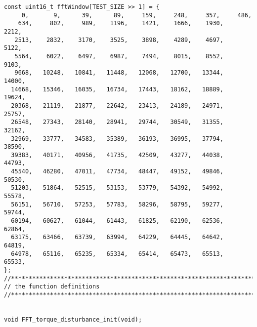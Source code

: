 \begin{lstlisting}[caption=\raggedright{mcu-libs/RLS.h}, frame=single]
const uint16_t fftWindow[TEST_SIZE >> 1] = {
     0,       9,      39,      89,     159,     248,     357,     486,
    634,     802,     989,    1196,    1421,    1666,    1930,    2212,
   2513,    2832,    3170,    3525,    3898,    4289,    4697,    5122,
   5564,    6022,    6497,    6987,    7494,    8015,    8552,    9103,
   9668,   10248,   10841,   11448,   12068,   12700,   13344,   14000,
  14668,   15346,   16035,   16734,   17443,   18162,   18889,   19624,
  20368,   21119,   21877,   22642,   23413,   24189,   24971,   25757,
  26548,   27343,   28140,   28941,   29744,   30549,   31355,   32162,
  32969,   33777,   34583,   35389,   36193,   36995,   37794,   38590,
  39383,   40171,   40956,   41735,   42509,   43277,   44038,   44793,
  45540,   46280,   47011,   47734,   48447,   49152,   49846,   50530,
  51203,   51864,   52515,   53153,   53779,   54392,   54992,   55578,
  56151,   56710,   57253,   57783,   58296,   58795,   59277,   59744,
  60194,   60627,   61044,   61443,   61825,   62190,   62536,   62864,
  63175,   63466,   63739,   63994,   64229,   64445,   64642,   64819,
  64978,   65116,   65235,   65334,   65414,   65473,   65513,   65533,
};
//*****************************************************************************
// the function definitions
//*****************************************************************************


void FFT_torque_disturbance_init(void);

\end{lstlisting}